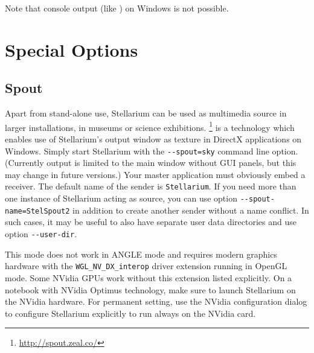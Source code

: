 \noindent Note that console output (like ) on Windows is not possible. 

\section{Special Options}
\label{sec:CommandLineOptions:Special}
\subsection{Spout} 
\label{sec:CommandLineOptions:Special:Spout}
Apart from stand-alone use, Stellarium can be used as multimedia source in larger installations, in museums or science exhibitions. 
\footnote{\url{http://spout.zeal.co/}} is a technology which enables use of Stellarium's 
output window as texture in DirectX applications on Windows. Simply start Stellarium with 
the \texttt{-\/-spout=sky} command line option. (Currently  output is limited to the main window 
without GUI panels, but this may change in future versions.) 
Your master application must obviously embed a  receiver. 
The default name of the  sender is \texttt{Stellarium}. If you need more than one instance of Stellarium acting as source, 
you can use option \texttt{-\/-spout-name=StelSpout2} in addition to create another  sender without a name conflict. 
In such cases, it may be useful to also have separate user data directories and use option \texttt{-\/-user-dir}. 

This mode does not work in ANGLE mode and requires modern graphics hardware with the \texttt{WGL\_NV\_DX\_interop} 
driver extension running in OpenGL mode. Some NVidia GPUs work without this extension listed explicitly. 
On a notebook with NVidia Optimus technology, make sure to launch Stellarium on the NVidia hardware. 
For permanent setting, use the NVidia configuration dialog to configure Stellarium explicitly to run always on the NVidia card.



